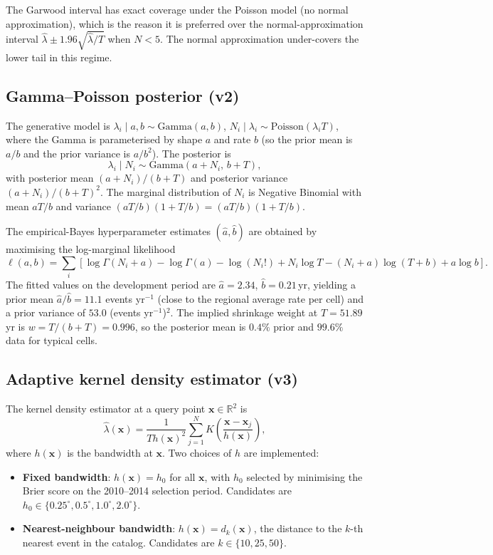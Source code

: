 \documentclass[10pt,a4paper,twocolumn]{article}
\begin{document}
The Garwood interval has exact coverage under the Poisson model (no normal approximation), which is the reason it is preferred over the normal-approximation interval $\hat\lambda \pm 1.96\sqrt{\hat\lambda/T}$ when $N<5$. The normal approximation under-covers the lower tail in this regime.

\subsection{Gamma--Poisson posterior (v2)}\label{app:gamma-poisson}

The generative model is $\lambda_i \mid a, b \sim \text{Gamma}(a, b)$, $N_i \mid \lambda_i \sim \text{Poisson}(\lambda_i T)$, where the Gamma is parameterised by shape $a$ and rate $b$ (so the prior mean is $a/b$ and the prior variance is $a/b^2$). The posterior is
\[
\lambda_i \mid N_i \sim \text{Gamma}(a + N_i,\, b + T),
\]
with posterior mean $(a+N_i)/(b+T)$ and posterior variance $(a+N_i)/(b+T)^2$. The marginal distribution of $N_i$ is Negative Binomial with mean $aT/b$ and variance $(aT/b)(1 + T/b) = (aT/b)(1 + T/b)$.

The empirical-Bayes hyperparameter estimates $(\hat a, \hat b)$ are obtained by maximising the log-marginal likelihood
\[
\ell(a, b) = \sum_i \left[ \log\Gamma(N_i + a) - \log\Gamma(a) - \log(N_i!) + N_i \log T - (N_i + a)\log(T + b) + a \log b \right].
\]
The fitted values on the development period are $\hat a = 2.34$, $\hat b = 0.21$\,yr, yielding a prior mean $\hat a / \hat b = 11.1$ events yr$^{-1}$ (close to the regional average rate per cell) and a prior variance of $53.0$ (events yr$^{-1}$)$^2$. The implied shrinkage weight at $T=51.89$\,yr is $w = T/(b+T) = 0.996$, so the posterior mean is $0.4\%$ prior and $99.6\%$ data for typical cells.

\subsection{Adaptive kernel density estimator (v3)}\label{app:kde}

The kernel density estimator at a query point $\mathbf{x}\in\mathbb{R}^2$ is
\[
\hat\lambda(\mathbf{x}) = \frac{1}{T h(\mathbf{x})^2} \sum_{j=1}^{N} K\!\left( \frac{\mathbf{x} - \mathbf{x}_j}{h(\mathbf{x})} \right),
\]
where $h(\mathbf{x})$ is the bandwidth at $\mathbf{x}$. Two choices of $h$ are implemented:

\begin{itemize}[leftmargin=1.2em,itemsep=2pt,topsep=2pt]
\item \textbf{Fixed bandwidth}: $h(\mathbf{x}) = h_0$ for all $\mathbf{x}$, with $h_0$ selected by minimising the Brier score on the 2010--2014 selection period. Candidates are $h_0\in\{0.25^\circ, 0.5^\circ, 1.0^\circ, 2.0^\circ\}$.
\item \textbf{Nearest-neighbour bandwidth}: $h(\mathbf{x}) = d_k(\mathbf{x})$, the distance to the $k$-th nearest event in the catalog. Candidates are $k\in\{10, 25, 50\}$.
\end{itemize}
\end{document}
